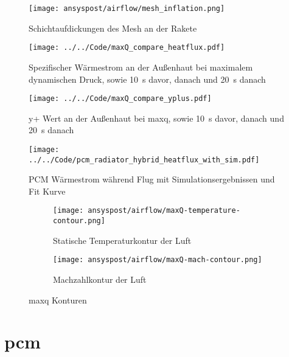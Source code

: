 \begin{figure}[H]
  \centering
  \texttt{[image: ansyspost/airflow/mesh\_inflation.png]}
  \caption{Schichtaufdickungen des Mesh an der Rakete}\label{fig:aussenstroemung_mesh_inflationlayers}
\end{figure}

\begin{figure}[H]
  \centering
  \texttt{[image: ../../Code/maxQ\_compare\_heatflux.pdf]}
  \caption{Spezifischer Wärmestrom an der Außenhaut bei maximalem dynamischen Druck, sowie \SI{10}{s} davor, danach und \SI{20}{s} danach}\label{fig:spezifischer_waermestrom_maxQ_simulationen}
\end{figure}

\begin{figure}[H]
  \centering
  \texttt{[image: ../../Code/maxQ\_compare\_yplus.pdf]}
  \caption{y+ Wert an der Außenhaut bei \ac{maxq}, sowie \SI{10}{s} davor, danach und \SI{20}{s} danach}\label{fig:yplus_maxQ_simulationen}
\end{figure}

\begin{figure}[H]
  \centering
  \texttt{[image: ../../Code/pcm\_radiator\_hybrid\_heatflux\_with\_sim.pdf]}
  \caption{PCM Wärmestrom während Flug mit Simulationsergebnissen und Fit Kurve}\label{fig:pcm_waermestrom_sim}
\end{figure}

\begin{figure}[H]
    \centering

    \begin{subfigure}{\textwidth}
        \centering
        \texttt{[image: ansyspost/airflow/maxQ-temperature-contour.png]}
        \caption{Statische Temperaturkontur der Luft}
        \label{fig:maxQ_temp_contour}
    \end{subfigure}

    \begin{subfigure}{\textwidth}
        \centering
        \texttt{[image: ansyspost/airflow/maxQ-mach-contour.png]}
        \caption{Machzahlkontur der Luft}
        \label{fig:maxQ_mach_contour}
    \end{subfigure}

    \caption{\texorpdfstring{\ac{maxq}}{max Q} Konturen}
    \label{fig:maxQ_konturen}
\end{figure}

\section{\texorpdfstring{\ac{pcm}}{PCM}}

